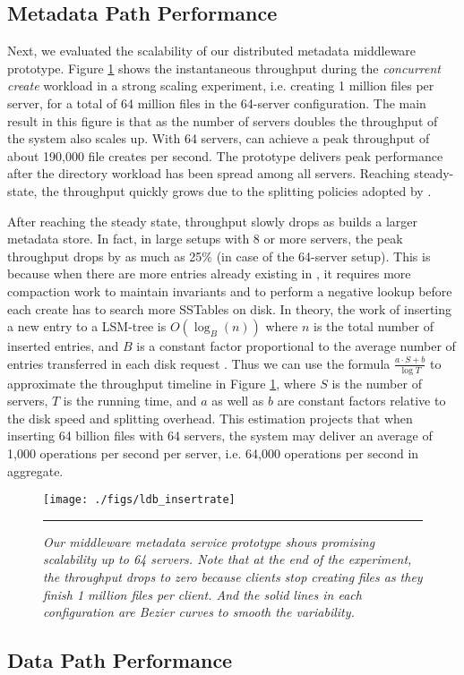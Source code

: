 \subsection{Metadata Path Performance}

Next, we evaluated the scalability of our distributed metadata middleware
prototype.
Figure \ref{graph:ldb-scaling} shows the instantaneous throughput during the
\textit{concurrent create} workload in a strong scaling experiment, i.e.
creating 1 million files per server, for a total of 64 million files in the
64-server configuration.
The main result in this figure is that as the number of servers doubles the
throughput of the system also scales up. With 64 servers, \giga{} can achieve a
peak throughput of about 190,000 file creates per second. The prototype delivers
peak performance after the directory workload has been spread among all
servers.
Reaching steady-state, the throughput quickly grows due to the splitting
policies adopted by \giga{}.

After reaching the steady state, throughput slowly drops as \ldb builds a
larger metadata store.
In fact, in large setups with 8 or more servers,
the peak throughput drops by as much as 25\% (in case of the 64-server setup).
This is because when there are more entries already existing in \ldb,
it requires more compaction work to maintain \ldb invariants and to perform a
negative lookup before each create has to search more SSTables on disk.
In theory, the work of inserting a new entry to a LSM-tree is $O(\log_{B}(n))$
where $n$ is the total number of inserted entries, and $B$ is a constant factor
proportional to the average number of entries transferred in each disk request
\cite{Bender2007}.
Thus we can use the formula $\frac{a\cdot S+b}{\log{T}}$ to
approximate the throughput timeline in Figure \ref{graph:ldb-scaling},
where $S$ is the number of servers, $T$ is the running time, and $a$ as well as $b$
are constant factors relative to the disk speed and splitting overhead.
This estimation projects that when inserting 64 billion files with 64 servers,
the system may deliver an average of 1,000 operations per second per server,
i.e. 64,000 operations per second in aggregate.

\begin{figure}[t]  %
\centerline{\texttt{[image: ./figs/ldb\_insertrate]}}
\vspace{10pt}
\caption{\normalsize
\textit{Our middleware metadata service prototype shows promising scalability
up to 64 servers.
Note that at the end of the experiment,
the throughput drops to zero
because clients stop creating files as they finish 1 million files per client.
And the solid lines in each configuration are Bezier
curves to smooth the variability.}
}
\vspace{10pt}
\hrule
\label{graph:ldb-scaling}
\end{figure}       %

\subsection{Data Path Performance}

